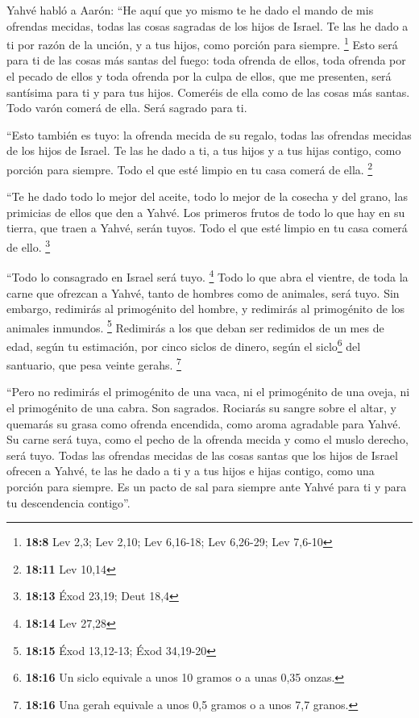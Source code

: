 \begin{paracol}{2}
 Yahvé habló a Aarón: ``He aquí que yo mismo te he dado el
mando de mis ofrendas mecidas, todas las cosas sagradas de los hijos de
Israel. Te las he dado a ti por razón de la unción, y a tus hijos, como
porción para siempre. \footnote{\textbf{18:8} Lev 2,3; Lev 2,10; Lev
  6,16-18; Lev 6,26-29; Lev 7,6-10}  Esto será para ti de
las cosas más santas del fuego: toda ofrenda de ellos, toda ofrenda por
el pecado de ellos y toda ofrenda por la culpa de ellos, que me
presenten, será santísima para ti y para tus hijos. 
Comeréis de ella como de las cosas más santas. Todo varón comerá de
ella. Será sagrado para ti.

 ``Esto también es tuyo: la ofrenda mecida de su regalo,
todas las ofrendas mecidas de los hijos de Israel. Te las he dado a ti,
a tus hijos y a tus hijas contigo, como porción para siempre. Todo el
que esté limpio en tu casa comerá de ella. \footnote{\textbf{18:11} Lev
  10,14}

 ``Te he dado todo lo mejor del aceite, todo lo mejor de
la cosecha y del grano, las primicias de ellos que den a Yahvé.
 Los primeros frutos de todo lo que hay en su tierra, que
traen a Yahvé, serán tuyos. Todo el que esté limpio en tu casa comerá de
ello. \footnote{\textbf{18:13} Éxod 23,19; Deut 18,4}

 ``Todo lo consagrado en Israel será tuyo. \footnote{\textbf{18:14}
  Lev 27,28}  Todo lo que abra el vientre, de toda la
carne que ofrezcan a Yahvé, tanto de hombres como de animales, será
tuyo. Sin embargo, redimirás al primogénito del hombre, y redimirás al
primogénito de los animales inmundos. \footnote{\textbf{18:15} Éxod
  13,12-13; Éxod 34,19-20}  Redimirás a los que deban ser
redimidos de un mes de edad, según tu estimación, por cinco siclos de
dinero, según el siclo\footnote{\textbf{18:16} Un siclo equivale a unos
  10 gramos o a unas 0,35 onzas.} del santuario, que pesa veinte gerahs.
\footnote{\textbf{18:16} Una gerah equivale a unos 0,5 gramos o a unos
  7,7 granos.}

 ``Pero no redimirás el primogénito de una vaca, ni el
primogénito de una oveja, ni el primogénito de una cabra. Son sagrados.
Rociarás su sangre sobre el altar, y quemarás su grasa como ofrenda
encendida, como aroma agradable para Yahvé.  Su carne
será tuya, como el pecho de la ofrenda mecida y como el muslo derecho,
será tuyo.  Todas las ofrendas mecidas de las cosas
santas que los hijos de Israel ofrecen a Yahvé, te las he dado a ti y a
tus hijos e hijas contigo, como una porción para siempre. Es un pacto de
sal para siempre ante Yahvé para ti y para tu descendencia contigo''.


\end{paracol}
